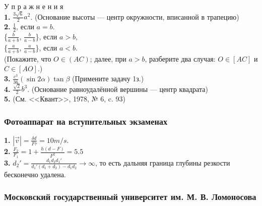 \begin{multicols}{2}
    У п р а ж н е н и я\\
    \textbf{1.} $\frac{3\sqrt{6}}{2}a^2$. (Основание высоты --- центр окружности, вписанной в трапецию)\\
    \textbf{2.} $\frac{1}{2}$, если $a=b$.\\
    \{$\frac{b}{a+b}$, $\frac{b}{a-b}$\}, если $a>b$,\\
    \{$\frac{a}{a+b}$, $\frac{a}{a-b}$\}, если $a<b$.\\
    (Покажите, что $O \in (AC)$; далее, при $a>b$, разберите два случая: $O \in [AC]$ и $C \in [AO]$.)\\
    \textbf{3.} $\frac{c^3}{36}(\sin 2\alpha)\tan\beta$ (Примените задачу 1з.)\\
    \textbf{4.} $\frac{\sqrt{2}}{2}b^3$. (Основание равноудалённой вершины --- центр квадрата)\\
    \textbf{5.} (См. <<Квант>>, 1978, № 6, c. 93)
    \subsubsection*{Фотоаппарат на вступительных экзаменах}
    \textbf{1.} $|\overset{\rightarrow}{v}|=\frac{\delta d}{F\tau}=10m/s$.\\
    \textbf{2.} $\frac{F_2}{F_1}=1+\frac{h(d-F)}{F^2}=5.5$\\
    \textbf{3.} $d_2'=\frac{d_1d_2d_1'}{d_1'(d_1+d_2)-d_1d_2}\rightarrow\infty$, то есть дальняя граница глубины резкости бесконечно удалена.\\
    \subsubsection*{Московский государственный университет им. М. В. Ломоносова}

\end{multicols}
